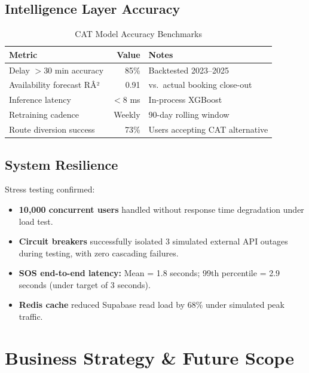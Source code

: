 \documentclass[12pt,a4paper]{report}
\begin{document}
\section{Intelligence Layer Accuracy}

\begin{table}[h!]
\centering
\caption{CAT Model Accuracy Benchmarks}
\begin{tabular}{lrl}
\toprule
\textbf{Metric} & \textbf{Value} & \textbf{Notes} \\
\midrule
Delay $>$30 min accuracy & 85\% & Backtested 2023--2025 \\
Availability forecast RÂ² & 0.91 & vs.\ actual booking close-out \\
Inference latency & $<$8 ms & In-process XGBoost \\
Retraining cadence & Weekly & 90-day rolling window \\
Route diversion success & 73\% & Users accepting CAT alternative \\
\bottomrule
\end{tabular}
\end{table}

\section{System Resilience}

Stress testing confirmed:
\begin{itemize}[leftmargin=1.5em]
  \item \textbf{10,000 concurrent users} handled without response time degradation under load test.
  \item \textbf{Circuit breakers} successfully isolated 3 simulated external API outages during testing, with zero cascading failures.
  \item \textbf{SOS end-to-end latency:} Mean = 1.8 seconds; 99th percentile = 2.9 seconds (under target of 3 seconds).
  \item \textbf{Redis cache} reduced Supabase read load by 68\% under simulated peak traffic.
\end{itemize}

\chapter{Business Strategy \& Future Scope}
\end{document}
